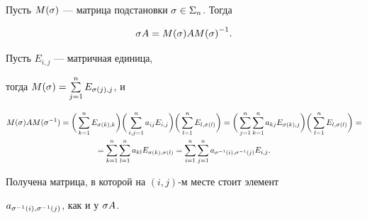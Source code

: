 \begin{lem}


Пусть $M(\sigma )$ --- матрица подстановки $\sigma \in \Sigma_n$. Тогда


$$


\s A=M(\s )A{M(\s )}^{-1}.


$$


\end{lem}





\begin{pf}


Пусть $E_{i,j}$ --- матричная единица,


тогда $M(\sigma)=\sum\limits_{j=1}^n E_{\sigma (j),j}$, и


\begin{gather*}


M(\s )AM(\s ^{-1})=\bigg(\sum\limits_{k=1}^n E_{\s (k),k}\bigg)


\bigg(\sum\limits_{i,j=1}^n a_{ij}E_{i,j}\bigg)


\bigg(\sum\limits_{l=1}^n E_{l,\s (l)}\bigg)=


\bigg(\sum\limits_{j=1}^n \sum\limits_{k=1}^n a_{kj}E_{\s (k),j}\bigg)


\bigg(\sum\limits_{l=1}^n E_{l,\s (l)}\bigg)=\\


%


=\sum\limits_{k=1}^n \sum\limits_{l=1}^n a_{kl}E_{\s (k),\s (l)}=


\sum\limits_{i=1}^n \sum\limits_{j=1}^n a_{\s ^{-1}(i),\s ^{-1}(j)}E_{i,j}.


\end{gather*}


Получена матрица, в которой на $(i,j)$-м месте стоит элемент


$a_{\sigma ^{-1}(i),\sigma ^{-1}(j)}$, как и у $\sigma A$.


\end{pf}





